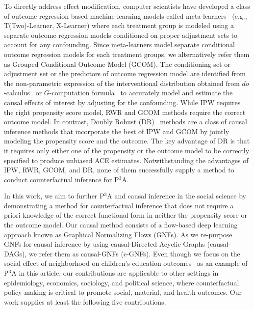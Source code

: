 \documentclass[letterpaper]{article} %
\begin{document}
To directly address effect modification, computer scientists have developed a class of outcome regression based machine-learning models called meta-learners~\cite{kunzel2019metalearners} (e.g., T(Two)-Learner, X-Learner) where each treatment group is modeled using a separate outcome regression models conditioned on proper adjustment sets to account for any confounding.
Since meta-learners model separate conditional outcome regression models for each treatment groups, we alternatively refer them as Grouped Conditional Outcome Model (GCOM).
The conditioning set or adjustment set or the predictors of outcome regression model are identified from the non-parametric expression of the interventional distribution obtained from $do$-calculus~\cite{pearl2009causality, pearl2012docalculus} or $G$-computation formula~\cite{ROBINS1986gcom, hernan2009ipw} to accurately model and estimate the causal effects of interest by adjusting for the confounding.
While IPW requires the right propensity score model, RWR and GCOM methods require the correct outcome model.
In contrast, Doubly Robust (DR)~\cite{bang2005doublyrobust} methods are a class of causal inference methods that incorporate the best of IPW and GCOM by jointly modeling the propensity score and the outcome. The key advantage of DR is that it requires only either one of the propensity or the outcome model to be  correctly specified to produce unbiased ACE estimates. Notwithstanding the advantages of IPW, RWR, GCOM, and DR, none of them successfully supply a method to conduct counterfactual inference for P$^3$A.

In this work, we aim to further P$^3$A and causal inference in the social science by demonstrating a method for counterfactual inference that does not require a priori knowledge of the correct functional form in neither the propensity score or the outcome model. Our causal method consists of a flow-based deep learning approach known as Graphical Normalizing Flows (GNFs). As we re-purpose GNFs for causal inference by using causal-Directed Acyclic Graphs (causal-DAGs), we refer them as causal-GNFs (c-GNFs). Even though we focus on the social effect of neighborhood on children's education outcomes~\cite{wodtke2020rwr} as an example of P$^3$A in this article, our contributions are applicable to other settings in epidemiology, economics, sociology, and political science, where counterfactual policy-making is critical to promote social, material, and health outcomes.
Our work supplies at least the following five contributions.
\end{document}
